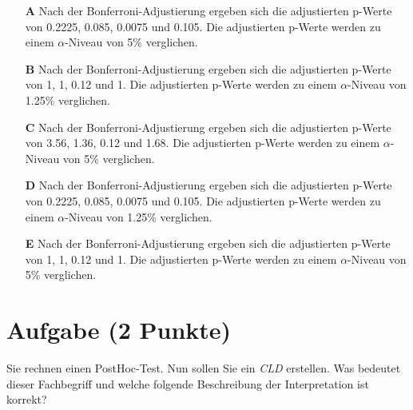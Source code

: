 \documentclass[a4paper, 9pt]{scrartcl}\usepackage[]{graphicx}\usepackage[]{xcolor}
\begin{document}
\begin{enumerate}
\item [\textbf{A} \msquare] Nach der Bonferroni-Adjustierung ergeben sich die adjustierten p-Werte von 0.2225, 0.085, 0.0075 und 0.105. Die adjustierten p-Werte werden zu einem $\alpha$-Niveau von 5\% verglichen.
\item [\textbf{B} \msquare] Nach der Bonferroni-Adjustierung ergeben sich die adjustierten p-Werte von 1, 1, 0.12 und 1. Die adjustierten p-Werte werden zu einem $\alpha$-Niveau von 1.25\% verglichen.
\item [\textbf{C} \msquare] Nach der Bonferroni-Adjustierung ergeben sich die adjustierten p-Werte von 3.56, 1.36, 0.12 und 1.68. Die adjustierten p-Werte werden zu einem $\alpha$-Niveau von 5\% verglichen.
\item [\textbf{D} \msquare] Nach der Bonferroni-Adjustierung ergeben sich die adjustierten p-Werte von 0.2225, 0.085, 0.0075 und 0.105. Die adjustierten p-Werte werden zu einem $\alpha$-Niveau von 1.25\% verglichen.
\item [\textbf{E} \msquare] Nach der Bonferroni-Adjustierung ergeben sich die adjustierten p-Werte von 1, 1, 0.12 und 1. Die adjustierten p-Werte werden zu einem $\alpha$-Niveau von 5\% verglichen.
\end{enumerate}

\section{Aufgabe \hfill (2 Punkte)}



Sie rechnen einen PostHoc-Test. Nun sollen Sie ein \textit{CLD} erstellen. Was bedeutet dieser Fachbegriff und welche folgende Beschreibung der Interpretation ist korrekt?
\end{document}
